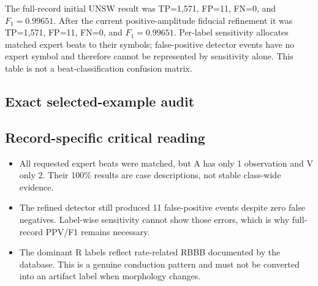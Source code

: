 \documentclass[11pt]{article}
\begin{document}
        The full-record initial UNSW result was TP=1,571, FP=11,
        FN=0, and $F_1=0.99651$. After the current positive-amplitude
        fiducial refinement it was TP=1,571, FP=11,
        FN=0, and $F_1=0.99651$. Per-label sensitivity allocates
        matched expert beats to their symbols; false-positive detector events have no expert symbol and therefore
        cannot be represented by sensitivity alone. This table is not a beat-classification confusion matrix.

        \subsection{Exact selected-example audit}
        \begin{table}[H]
        \centering
        \caption{Timing results for the deterministic displayed examples. Errors are detector minus expert.}
        \end{table}

        \subsection{Record-specific critical reading}
        \begin{itemize}
        \item All requested expert beats were matched, but A has only 1 observation and V only 2. Their 100\% results are case descriptions, not stable class-wide evidence.
\item The refined detector still produced 11 false-positive events despite zero false negatives. Label-wise sensitivity cannot show those errors, which is why full-record PPV/F1 remains necessary.
\item The dominant R labels reflect rate-related RBBB documented by the database. This is a genuine conduction pattern and must not be converted into an artifact label when morphology changes.
        \end{itemize}
\end{document}
